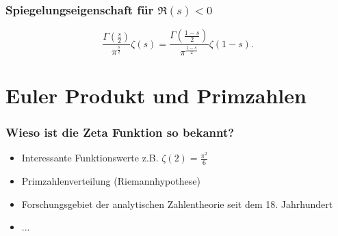 \documentclass[ngerman, aspectratio=169]{beamer}
\begin{document}
    \begin{frame}
        \frametitle{Spiegelungseigenschaft für $\Re(s) < 0$}
        \begin{equation*}\label{zeta:equation:functional}
            \frac{\Gamma \left( \frac{s}{2} \right)}{\pi^{\frac{s}{2}}}
            \zeta(s)
            =
            \frac{\Gamma \left( \frac{1-s}{2} \right)}{\pi^{\frac{1-s}{2}}}
            \zeta(1-s).
        \end{equation*}
    \end{frame}

    \section{Euler Produkt und Primzahlen}
    \begin{frame}
        \frametitle{Wieso ist die Zeta Funktion so bekannt?}
        \begin{itemize}
            \item Interessante Funktionswerte z.B. $\zeta(2) = \frac{\pi^2}{6}$
            \item Primzahlenverteilung (Riemannhypothese)
            \item Forschungsgebiet der analytischen Zahlentheorie seit dem 18. Jahrhundert
            \item ...
        \end{itemize}
    \end{frame}
\end{document}
